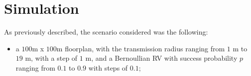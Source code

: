 %
\chapter{Simulation}\label{ch:simulation}
As previously described, the scenario considered was the following:
\begin{itemize}
    \item a $100$m x $100$m floorplan, with the transmission
    radius ranging from $1$ m to $19$ m, with a step of $1$ m, and a Bernoullian RV
    with success probability $p$ ranging from $0.1$ to $0.9$ with steps of $0.1$;
\end{itemize}
